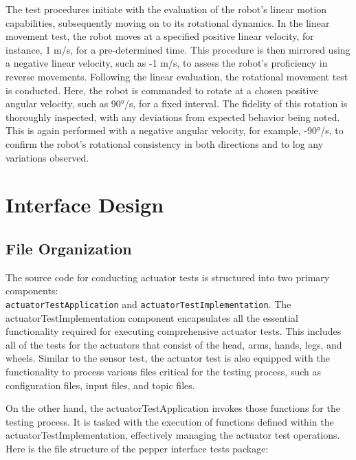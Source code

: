 \documentclass{CSSRforAfrica}
\renewcommand{\DTstyle}{\footnotesize\sffamily}
\begin{document}
The test procedures initiate with the evaluation of the robot's linear motion capabilities, subsequently moving on to its 
rotational dynamics. In the linear movement test, the robot moves at a specified positive linear velocity, for instance, 
1 m/s, for a pre-determined time. This procedure is then mirrored using a negative linear velocity, such 
as -1 m/s, to assess the robot's proficiency in reverse movements. Following the linear evaluation, the rotational movement test 
is conducted. Here, the robot is commanded to rotate at a chosen positive angular velocity, such as 90°/s, for a fixed interval. 
The fidelity of this rotation is thoroughly inspected, with any deviations from expected behavior being noted. This 
is again performed with a negative angular velocity, for example, -90°/s, to confirm the robot's rotational consistency in both 
directions and to log any variations observed.

\newpage

\section{Interface Design}
\subsection*{File Organization}
The source code for conducting actuator tests is structured into two primary components: \\
\texttt{actuatorTestApplication} and \texttt{actuatorTestImplementation}. The actuatorTestImplementation 
component encapsulates all the essential functionality required for executing comprehensive actuator tests. 
This includes all of the tests for the actuators that consist of the head, arms, hands, legs, and wheels.
Similar to the sensor test, the actuator test is also equipped with the functionality to process various files
critical for the testing process, such as configuration files, input files, and topic files.

On the other hand, the actuatorTestApplication invokes those functions for the testing process. It is tasked with the
execution of functions defined within the actuatorTestImplementation, effectively managing the actuator test operations.\\

Here is the file structure of the pepper interface tests package:

\vspace*{0.5em}

\renewcommand*\DTstyle{\ttfamily}
\end{document}
